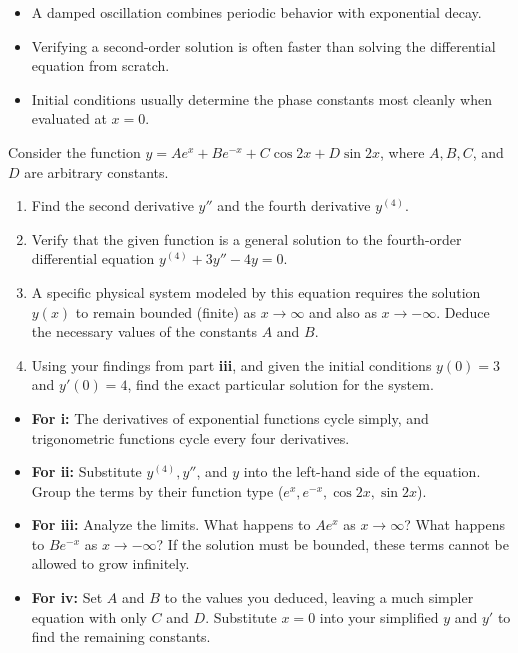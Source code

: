 \begin{takeaways}
\begin{itemize}[leftmargin=*]
    \item A damped oscillation combines periodic behavior with exponential decay.
    \item Verifying a second-order solution is often faster than solving the differential equation from scratch.
    \item Initial conditions usually determine the phase constants most cleanly when evaluated at $x=0$.
\end{itemize}
\end{takeaways}

\vspace{1cm}

\begin{problem}
Consider the function $y = Ae^x + Be^{-x} + C\cos 2x + D\sin 2x$, where $A, B, C$, and $D$ are arbitrary constants.

\begin{enumerate}
    \item[\textbf{i}] Find the second derivative $y''$ and the fourth derivative $y^{(4)}$. 
    \item[\textbf{ii}] Verify that the given function is a general solution to the fourth-order differential equation $y^{(4)} + 3y'' - 4y = 0$.
    \item[\textbf{iii}] A specific physical system modeled by this equation requires the solution $y(x)$ to remain bounded (finite) as $x \to \infty$ and also as $x \to -\infty$. Deduce the necessary values of the constants $A$ and $B$.
    \item[\textbf{iv}] Using your findings from part \textbf{iii}, and given the initial conditions $y(0) = 3$ and $y'(0) = 4$, find the exact particular solution for the system.
\end{enumerate}
\end{problem}

\begin{hint}
\begin{itemize}
    \item \textbf{For i:} The derivatives of exponential functions cycle simply, and trigonometric functions cycle every four derivatives. 
    \item \textbf{For ii:} Substitute $y^{(4)}, y''$, and $y$ into the left-hand side of the equation. Group the terms by their function type ($e^x, e^{-x}, \cos 2x, \sin 2x$).
    \item \textbf{For iii:} Analyze the limits. What happens to $Ae^x$ as $x \to \infty$? What happens to $Be^{-x}$ as $x \to -\infty$? If the solution must be bounded, these terms cannot be allowed to grow infinitely.
    \item \textbf{For iv:} Set $A$ and $B$ to the values you deduced, leaving a much simpler equation with only $C$ and $D$. Substitute $x=0$ into your simplified $y$ and $y'$ to find the remaining constants.
\end{itemize}
\end{hint}

